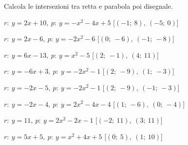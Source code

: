 \newpage %

\begin{esercizio}\label{ese:}
 Calcola le intersezioni tra retta e parabola poi disegnale.
 \begin{enumeratea}
  \item  \(r:~y = 2 x +10,~p:~y=- x^2 -4 x +5\)
   \hfill [\(\left (-1;~8 \right ),~\left (-5;~0 \right )\)]
  \item  \(r:~y = 2 x -6,~p:~y=-2 x^2 -6\)
   \hfill [\(\left (0;~-6 \right ),~\left (-1;~-8 \right )\)]
  \item  \(r:~y = 6 x -13,~p:~y=x^2 -5\)
   \hfill [\(\left (2;~-1 \right ),~\left (4;~11 \right )\)]
  \item  \(r:~y = -6 x +3,~p:~y=-2 x^2 -1\)
   \hfill [\(\left (2;~-9 \right ),~\left (1;~-3 \right )\)]
  \item  \(r:~y = -2 x -5,~p:~y=-2 x^2 -1\)
   \hfill [\(\left (2;~-9 \right ),~\left (-1;~-3 \right )\)]
  \item  \(r:~y = -2 x -4,~p:~y=2 x^2 -4 x -4\)
   \hfill [\(\left (1;~-6 \right ),~\left (0;~-4 \right )\)]
  \item  \(r:~y = 11,~p:~y=2 x^2 -2 x -1\)
   \hfill [\(\left (-2;~11 \right ),~\left (3;~11 \right )\)]
  \item  \(r:~y = 5 x +5,~p:~y=x^2 +4 x +5\)
   \hfill [\(\left (0;~5 \right ),~\left (1;~10 \right )\)]

\end{enumeratea}
\end{esercizio}
